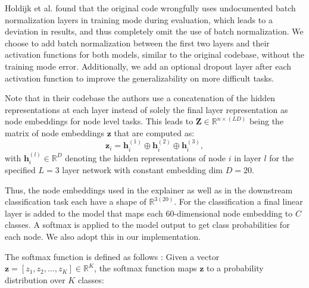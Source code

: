 Holdijk et al. \cite{holdijk2021re} found that the original code wrongfully uses undocumented batch normalization layers in training mode during evaluation, which leads to a deviation in results, and thus completely omit the use of batch normalization. We choose to add batch normalization between the first two layers and their activation functions for both models, similar to the original codebase, without the training mode error. Additionally, we add an optional dropout layer after each activation function to improve the generalizability on more difficult tasks. \bigskip


Note that in their codebase the authors use a concatenation of the hidden representations at each layer instead of solely the final layer representation as node embeddings for node level tasks.
This leads to $\mathbf{Z} \in \mathbb{R}^{n\times (LD)}$ being the matrix of node embeddings $\mathbf{z}$ that are computed as:
\begin{equation}
    \mathbf{z}_i = \mathbf{h}^{(1)}_i \oplus \mathbf{h}^{(2)}_i \oplus \mathbf{h}^{(3)}_i,
\end{equation}
with $\mathbf{h}^{(l)}_i \in  \mathbb{R}^D$ denoting the hidden representations of node $i$ in layer $l$ for the specified $L=3$ layer network with constant embedding dim $D=20$.\bigskip


Thus, the node embeddings used in the explainer as well as in the downstream classification task each have a shape of $\mathbb{R}^{3(20)}$. For the classification a final linear layer is added to the model that maps each $60$-dimensional node embedding to $C$ classes. A softmax is applied to the model output to get class probabilities for each node. We also adopt this in our implementation.

The softmax function is defined as follows \cite{Goodfellow-et-al-2016}:
Given a vector \( \mathbf{z} = [z_1, z_2, \dots, z_K] \in \mathbb{R}^K \), the softmax function maps \( \mathbf{z} \) to a probability distribution over \( K \) classes:

